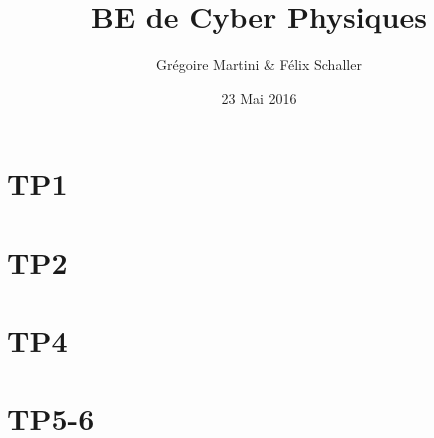 \documentclass[a4paper,12pt]{article}
\title{BE de Cyber Physiques}
\author{Grégoire Martini \& Félix Schaller }
\date{23 Mai 2016}
\begin{document}
\maketitle

\bigskip
\bigskip
\bigskip
\tableofcontents
\newpage


\section{TP1}

\section{TP2}

\section{TP4}

\section{TP5-6}
\end{document}
